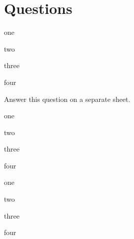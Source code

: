 \documentclass{scrartcl}
\newcommand*\choice{\item}
\begin{document}
\section{Questions}
\begin{multiplechoice}[choices=1]
  \choice one
  \choice two
  \choice three
  \choice four
\end{multiplechoice}

\begin{exercise}
  Answer this question on a separate sheet.
\end{exercise}

\begin{multiplechoice}[multiple]
  \choice one
  \choice two
  \choice three
  \choice four
\end{multiplechoice}

\begin{multiplechoice}[choices=2]
  \choice one
  \choice two
  \choice three
  \choice four
\end{multiplechoice}
\end{document}
